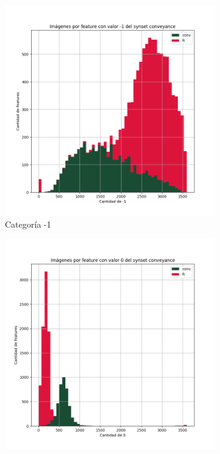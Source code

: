 \documentclass[12,twoside]{TFG-GM}
\theoremstyle{definition}
\theoremstyle{remark}
\begin{document}
\begin{figure}[ht] 
	\centering
	\begin{subfigure}[b]{0.3\textwidth}
		\includegraphics[width=\textwidth] {Images/plots/25/synsets/Images_per_feature_of_-1_category_conveyanceall_layers.png}
		\caption{Categoría -1}
	\end{subfigure}
	\begin{subfigure}[b]{0.3\textwidth}
		\includegraphics[width=\textwidth]  {Images/plots/25/synsets/Images_per_feature_of_0_category_conveyanceall_layers.png}

\end{subfigure}
\end{figure}
\end{document}
